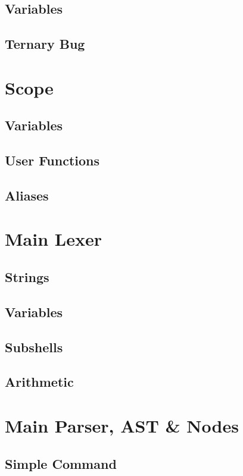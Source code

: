 \subsection{Variables}
\subsection{Ternary Bug}

\section{Scope}

\subsection{Variables}
\subsection{User Functions}
\subsection{Aliases}

\section{Main Lexer}

\subsection{Strings}
\subsection{Variables}
\subsection{Subshells}
\subsection{Arithmetic}

\section{Main Parser, AST \& Nodes}

\subsection{Simple Command}
